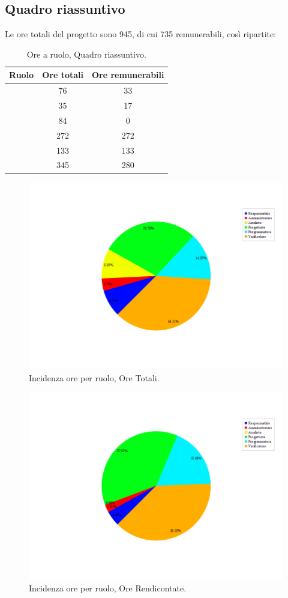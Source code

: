 \subsection{Quadro riassuntivo}
Le ore totali del progetto sono 945, di cui 735 remunerabili, così ripartite:
\begin{table}[H]
	\begin{center}
		\begin{tabular}{|c|c|c|}
			\hline
			\textbf{Ruolo}	& \textbf{Ore totali} & \textbf{Ore remunerabili} \\
			\hline
			\Res	&	76	&	33	\\
			\hline
			\Amm	&	35	&	17	\\
			\hline
			\Ana		&	84	&	0	\\
			\hline
			\Prog		&	272	&	272	\\
			\hline
			\Progr	&	133	&	133	\\
			\hline
			\Ver	&	345	&	280	\\
			\hline
		\end{tabular}
	\end{center}
	\caption{Ore a ruolo, Quadro riassuntivo.}
\end{table}

\begin{figure}[H]
	\centering
	\includegraphics[scale=0.5]{immagini/Grafi/OreRuoloOreTotali}
	\caption{Incidenza ore per ruolo, Ore Totali.}
\end{figure}

\begin{figure}[H]
	\centering
	\includegraphics[scale=0.5]{immagini/Grafi/OreRuoloRendicontabili}
	\caption{Incidenza ore per ruolo, Ore Rendicontate.}
\end{figure}
